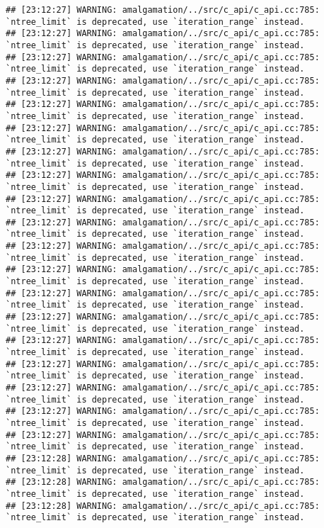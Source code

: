 \documentclass[
]{article}
\begin{document}
\begin{verbatim}
## [23:12:27] WARNING: amalgamation/../src/c_api/c_api.cc:785: `ntree_limit` is deprecated, use `iteration_range` instead.
## [23:12:27] WARNING: amalgamation/../src/c_api/c_api.cc:785: `ntree_limit` is deprecated, use `iteration_range` instead.
## [23:12:27] WARNING: amalgamation/../src/c_api/c_api.cc:785: `ntree_limit` is deprecated, use `iteration_range` instead.
## [23:12:27] WARNING: amalgamation/../src/c_api/c_api.cc:785: `ntree_limit` is deprecated, use `iteration_range` instead.
## [23:12:27] WARNING: amalgamation/../src/c_api/c_api.cc:785: `ntree_limit` is deprecated, use `iteration_range` instead.
## [23:12:27] WARNING: amalgamation/../src/c_api/c_api.cc:785: `ntree_limit` is deprecated, use `iteration_range` instead.
## [23:12:27] WARNING: amalgamation/../src/c_api/c_api.cc:785: `ntree_limit` is deprecated, use `iteration_range` instead.
## [23:12:27] WARNING: amalgamation/../src/c_api/c_api.cc:785: `ntree_limit` is deprecated, use `iteration_range` instead.
## [23:12:27] WARNING: amalgamation/../src/c_api/c_api.cc:785: `ntree_limit` is deprecated, use `iteration_range` instead.
## [23:12:27] WARNING: amalgamation/../src/c_api/c_api.cc:785: `ntree_limit` is deprecated, use `iteration_range` instead.
## [23:12:27] WARNING: amalgamation/../src/c_api/c_api.cc:785: `ntree_limit` is deprecated, use `iteration_range` instead.
## [23:12:27] WARNING: amalgamation/../src/c_api/c_api.cc:785: `ntree_limit` is deprecated, use `iteration_range` instead.
## [23:12:27] WARNING: amalgamation/../src/c_api/c_api.cc:785: `ntree_limit` is deprecated, use `iteration_range` instead.
## [23:12:27] WARNING: amalgamation/../src/c_api/c_api.cc:785: `ntree_limit` is deprecated, use `iteration_range` instead.
## [23:12:27] WARNING: amalgamation/../src/c_api/c_api.cc:785: `ntree_limit` is deprecated, use `iteration_range` instead.
## [23:12:27] WARNING: amalgamation/../src/c_api/c_api.cc:785: `ntree_limit` is deprecated, use `iteration_range` instead.
## [23:12:27] WARNING: amalgamation/../src/c_api/c_api.cc:785: `ntree_limit` is deprecated, use `iteration_range` instead.
## [23:12:27] WARNING: amalgamation/../src/c_api/c_api.cc:785: `ntree_limit` is deprecated, use `iteration_range` instead.
## [23:12:27] WARNING: amalgamation/../src/c_api/c_api.cc:785: `ntree_limit` is deprecated, use `iteration_range` instead.
## [23:12:28] WARNING: amalgamation/../src/c_api/c_api.cc:785: `ntree_limit` is deprecated, use `iteration_range` instead.
## [23:12:28] WARNING: amalgamation/../src/c_api/c_api.cc:785: `ntree_limit` is deprecated, use `iteration_range` instead.
## [23:12:28] WARNING: amalgamation/../src/c_api/c_api.cc:785: `ntree_limit` is deprecated, use `iteration_range` instead.

\end{verbatim}
\end{document}
